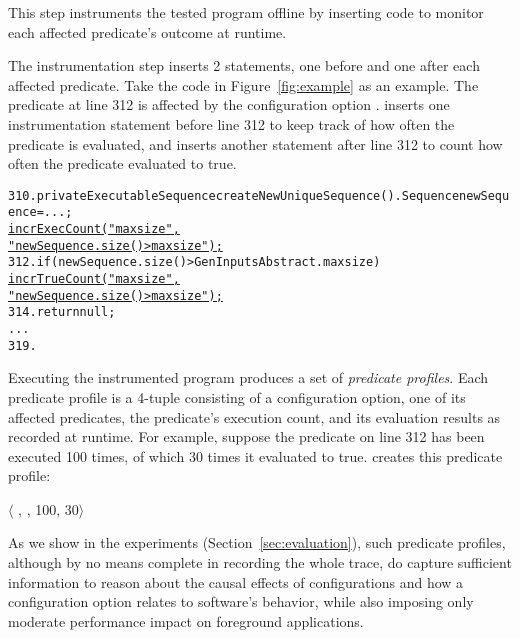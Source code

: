 This step instruments the tested program offline
by inserting code to monitor each affected predicate's outcome
at runtime.

The instrumentation step inserts 2 statements, one
before and one after each affected predicate. Take
the code in Figure~\ref{fig:example} as an example.
The predicate at line 312 is affected by
the configuration option . \ourtool inserts
one instrumentation statement before line 312 to
keep track of how often the predicate is evaluated, and
inserts another statement after line 312 to count how often
the predicate evaluated to true.


\begin{CodeOut}
\begin{alltt}
310. private ExecutableSequence createNewUniqueSequence() .   Sequence newSequence = ...; 
       \underline{incrExecCount("maxsize",}
                     \underline{"newSequence.size() > maxsize");}
312.   if (newSequence.size() > GenInputsAbstract.maxsize) \ttlcb
         \underline{incrTrueCount("maxsize",}
                       \underline{"newSequence.size() > maxsize");}
314.     return null;
      ...
319. \ttrcb
\end{alltt}
\end{CodeOut}


Executing the instrumented program
produces a set of \textit{predicate profiles}.
Each predicate profile is a 4-tuple consisting of a configuration option,
one of its affected predicates, the predicate's execution count, and its evaluation results as recorded at runtime. For example,
suppose the predicate on line 312 has been executed 100 times, of which
30 times it evaluated to true. \ourtool creates this predicate
profile:

$\langle$ , , 100, 30$\rangle$ 

\vspace{1mm}


As we show in the experiments (Section~\ref{sec:evaluation}),
such predicate profiles, although by no means complete in
recording the whole trace, do capture
sufficient information to reason about the causal effects of configurations
and how a configuration option relates to software's behavior, while
also imposing only moderate performance impact
on foreground applications.





